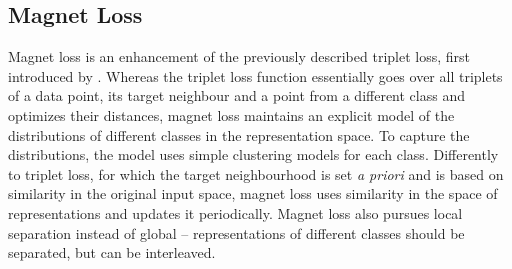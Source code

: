 \subsection{Magnet Loss}
Magnet loss is an enhancement of the previously described triplet loss, first introduced by \cite{rippel_metric_2016}. Whereas the triplet loss function essentially goes over all triplets of a data point, its target neighbour and a point from a different class and optimizes their distances, magnet loss maintains an explicit model of the distributions of different classes in the representation space. To capture the distributions, the model uses simple clustering models for each class. Differently to triplet loss, for which the target neighbourhood is set \textit{a priori} and is based on similarity in the original input space, magnet loss uses similarity in the space of representations and updates it periodically. Magnet loss also pursues local separation instead of global -- representations of different classes should be separated, but can be interleaved.

